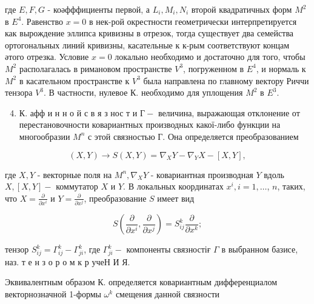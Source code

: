 \documentclass[10pt]{article}
\begin{document}
где $E, F, G$ - коәфффициенты первой, а $L_{i}, M_{i}, N_{i}$ второй квадратичных форм $M^{2}$ в $E^{4}$. Равенство $x=0$ в нек-рой окрестности геометрически интерпретируется как вырождение эллипса кривизны в отрезок, тогда существует два семейства ортогональных линий кривизны, касательные к к-рым соответствуют концам әтого отрезка. Условие $x=0$ локально необходимо и достаточно для того, чтобы $M^{2}$ располагалась в римановом пространстве $V^{3}$, погруженном в $E^{4}$, и нормаль к $M^{2}$ в касательном пространстве к $V^{3}$ была направлена по главному вектору Риччи тензора $V^{3}$. В частности, нулевое К. необходимо для уплощения $M^{2}$ в $E^{3}$.



\begin{enumerate}

  \setcounter{enumi}{3}

  \item К. афф и н н о й с в я з нос т и $Г-$ величина, выражающая отклонение от перестановочности ковариантных производных какої-либо функции на многообразии $M^{n}$ с этой связностью Г. Она определяется преобразованием

\end{enumerate}



\[

(X, Y) \rightarrow S(X, Y)=\nabla_{X} Y-\nabla_{Y} X-[X, Y],

\]



где $X, Y$ - векторные поля на $M^{n}, \nabla_{X} Y$ - ковариантная производная $Y$ вдоль $X,[X, Y]-$ коммутатор $X$ и $Y$. В локальных координатах $x^{i}, i=1, \ldots$, $n$, таких, что $X=\frac{\partial}{\partial x^{i}}$ и $Y=\frac{\partial}{\partial x^{j}}$, преобразование $S$ имеет вид



\[

S\left(\frac{\partial}{\partial x^{i}}, \frac{\partial}{\partial x^{j}}\right)=S_{i j}^{k} \frac{\partial}{\partial x^{k}} ;

\]



тензор $S_{i j}^{k}=\Gamma_{i j}^{k}-\Gamma_{j i}^{k}$, где $\Gamma_{j i}^{k}-$ компоненты связностіғ $\Gamma$ в выбранном базисе, наз. т е н $з$ о р о м к р учеН И Я.



Эквивалентным образом К. определяется ковариантным дифференциалом векторнозначной 1-формы $\omega^{k}$ смещения данной связности
\end{document}
